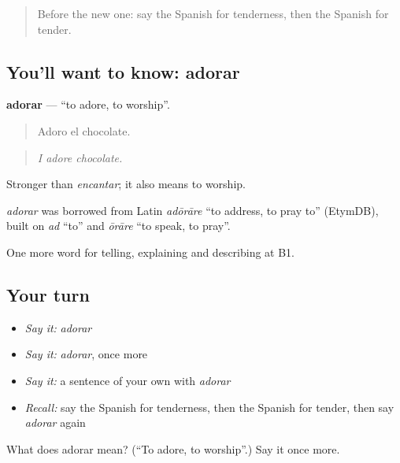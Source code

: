 \label{lesson:ES-C714-adorar}



\begin{quote}
Before the new one: say the Spanish for tenderness, then the Spanish for tender.
\end{quote}

\subsection*{You'll want to know: adorar}
\textbf{adorar} — \textquotedblleft{}to adore, to worship\textquotedblright{}.

\begin{quote}
Adoro el chocolate.
\end{quote}

\begin{quote}
\emph{I adore chocolate.}
\end{quote}

Stronger than \emph{encantar}; it also means to worship.

\begin{cousinweb}
\emph{adorar} was borrowed from Latin \emph{adōrāre} \textquotedblleft{}to address, to pray to\textquotedblright{} (EtymDB), built on \emph{ad} \textquotedblleft{}to\textquotedblright{} and \emph{ōrāre} \textquotedblleft{}to speak, to pray\textquotedblright{}.
\end{cousinweb}

\begin{grammarlens}[title={What you've built}]
One more word for telling, explaining and describing at B1.
\end{grammarlens}

\subsection*{Your turn}
\begin{itemize}
\raggedright
  \item \emph{Say it:} \emph{adorar}
  \item \emph{Say it:} \emph{adorar}, once more
  \item \emph{Say it:} a sentence of your own with \emph{adorar}
  \item \emph{Recall:} say the Spanish for tenderness, then the Spanish for tender, then say \emph{adorar} again
\end{itemize}

\begin{tcolorbox}[breakable,colback=teal!4,colframe=teal!35!black,title={Before you move on}]
What does adorar mean? (\textquotedblleft{}To adore, to worship\textquotedblright{}.) Say it once more.
\end{tcolorbox}
